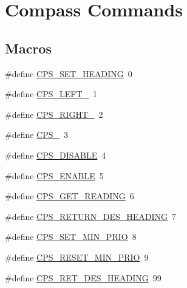 \hypertarget{group__compass__commands}{\section{Compass Commands}
\label{group__compass__commands}
}
\subsection*{Macros}
\begin{DoxyCompactItemize}
\item 
\#define \hyperlink{group__compass__commands_ga10dbf50964cb04b6648e3b65502c0ff4}{C\-P\-S\-\_\-\-S\-E\-T\-\_\-\-H\-E\-A\-D\-I\-N\-G}~0
\item 
\#define \hyperlink{group__compass__commands_gab51c4d4e21701c7cd0230a24c2ab74be}{C\-P\-S\-\_\-\-L\-E\-F\-T\-\_}~1
\item 
\#define \hyperlink{group__compass__commands_ga53ccdcb9ce75af6b95e56476367d2875}{C\-P\-S\-\_\-\-R\-I\-G\-H\-T\-\_}~2
\item 
\#define \hyperlink{group__compass__commands_gafb06fe5e8531750fd730129beb1c85a9}{C\-P\-S\-\_}~3
\item 
\#define \hyperlink{group__compass__commands_gacc391ac5638a636771f016cfa1991d4d}{C\-P\-S\-\_\-\-D\-I\-S\-A\-B\-L\-E}~4
\item 
\#define \hyperlink{group__compass__commands_ga7991975b6f6c2c5c731bafe810ebcab8}{C\-P\-S\-\_\-\-E\-N\-A\-B\-L\-E}~5
\item 
\#define \hyperlink{group__compass__commands_ga5804a250179671cacf4c9b1b4572d8de}{C\-P\-S\-\_\-\-G\-E\-T\-\_\-\-R\-E\-A\-D\-I\-N\-G}~6
\item 
\#define \hyperlink{group__compass__commands_gaa446e15281de94b24f27a8464025c20d}{C\-P\-S\-\_\-\-R\-E\-T\-U\-R\-N\-\_\-\-D\-E\-S\-\_\-\-H\-E\-A\-D\-I\-N\-G}~7
\item 
\#define \hyperlink{group__compass__commands_gaced5bbf2a229241444bd738fac5f6ba3}{C\-P\-S\-\_\-\-S\-E\-T\-\_\-\-M\-I\-N\-\_\-\-P\-R\-I\-O}~8
\item 
\#define \hyperlink{group__compass__commands_ga0173bb12991da4a513c3c4103a1fa2ba}{C\-P\-S\-\_\-\-R\-E\-S\-E\-T\-\_\-\-M\-I\-N\-\_\-\-P\-R\-I\-O}~9
\item 
\#define \hyperlink{group__compass__commands_gaa0a242da0fef5b0cb4d25feda73338b7}{C\-P\-S\-\_\-\-R\-E\-T\-\_\-\-D\-E\-S\-\_\-\-H\-E\-A\-D\-I\-N\-G}~99
\end{DoxyCompactItemize}


